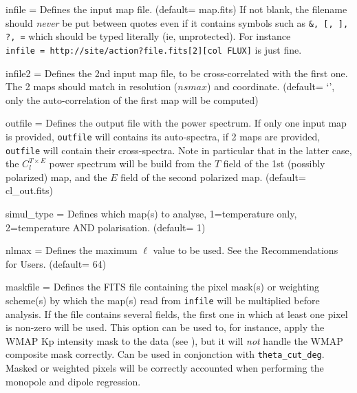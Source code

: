 \begin{qualifiers}
  \begin{qulist}{} %
    \item[{infile = }]%
 Defines the input map file. 
	(default= map.fits)
	If not blank, the filename should {\em never} be put between quotes even if it contains
symbols such as {\tt \&, [, ], ?, =} which should be typed literally (ie, unprotected). For instance
 {\tt infile~=~http://site/action?file.fits[2][col FLUX]} is just fine.
    \item[{infile2 = }]%
 Defines the 2nd input map file, to be cross-correlated with
	the first one. The 2 maps should match in resolution ($nsmax$) and coordinate.
	(default= `', only the auto-correlation of the first map will be computed)
    \item[{outfile = }]%
 Defines the output file with the power spectrum. If only
      one input map is provided, {\tt outfile} will contains its auto-spectra,
      if 2 maps are provided, {\tt outfile} will contain their
      cross-spectra. Note in particular that in the latter case, the $C^{T\times E}_l$ power
      spectrum will be build from the $T$ field of the 1st (possibly polarized) map, and the $E$
      field of the second polarized map.
(default= cl\_out.fits)
     \item[{simul\_type = }]%
 Defines which map(s) to analyse, 1=temperature only, 2=temperature AND polarisation.
(default= 1)
     \item[{nlmax = }]%
 Defines the maximum $\ell$ value 
to be used. See the Recommendations for Users. 
(default= 64)
 \item[{maskfile = }]%
 Defines the FITS file containing the pixel mask(s) or
 weighting scheme(s) by which the map(s) read from {\tt infile} will be
 multiplied before analysis. If the file contains several fields, the first
one in which at least one pixel is non-zero will be used. This option can be
 used to, for instance, apply
the WMAP Kp intensity mask to the data (see
), but it will {\em not} handle the WMAP composite mask correctly.
Can be used in conjonction with {\tt theta\_cut\_deg}. Masked or weighted pixels
 will be correctly accounted when performing the monopole and dipole regression.\\

\end{qulist}
\end{qualifiers}

